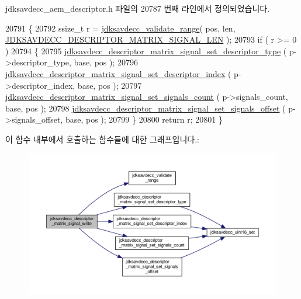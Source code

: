 jdksavdecc\+\_\+aem\+\_\+descriptor.\+h 파일의 20787 번째 라인에서 정의되었습니다.


\begin{DoxyCode}
20791 \{
20792     ssize\_t r = \hyperlink{group__util_ga9c02bdfe76c69163647c3196db7a73a1}{jdksavdecc\_validate\_range}( pos, len, 
      \hyperlink{group__descriptor__matrix__signal_ga590520dc48bf98bf3267e05a1f2cd374}{JDKSAVDECC\_DESCRIPTOR\_MATRIX\_SIGNAL\_LEN} );
20793     \textcolor{keywordflow}{if} ( r >= 0 )
20794     \{
20795         \hyperlink{group__descriptor__matrix__signal_ga810dfab95cdbd7f8a54a45f665d4fadf}{jdksavdecc\_descriptor\_matrix\_signal\_set\_descriptor\_type}
      ( p->descriptor\_type, base, pos );
20796         \hyperlink{group__descriptor__matrix__signal_gaf0da27eefdf8c74a0fbeef690170032e}{jdksavdecc\_descriptor\_matrix\_signal\_set\_descriptor\_index}
      ( p->descriptor\_index, base, pos );
20797         \hyperlink{group__descriptor__matrix__signal_ga65ec57d6454b78ef0a416759e11f28b0}{jdksavdecc\_descriptor\_matrix\_signal\_set\_signals\_count}
      ( p->signals\_count, base, pos );
20798         \hyperlink{group__descriptor__matrix__signal_ga46e1fb7ce57bdf53e8dadcd82dab3e04}{jdksavdecc\_descriptor\_matrix\_signal\_set\_signals\_offset}
      ( p->signals\_offset, base, pos );
20799     \}
20800     \textcolor{keywordflow}{return} r;
20801 \}
\end{DoxyCode}


이 함수 내부에서 호출하는 함수들에 대한 그래프입니다.\+:
\nopagebreak
\begin{figure}[H]
\begin{center}
\leavevmode
\includegraphics[width=350pt]{group__descriptor__matrix__signal_ga76af29ea723d0c6bdc678c35a0c9056e_cgraph}
\end{center}
\end{figure}



